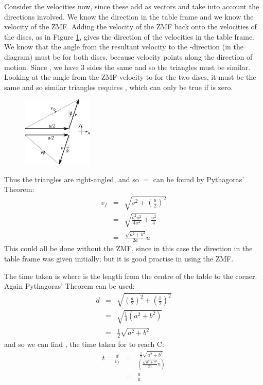 \begin{problem}
{\begin{enumerate}
Consider the velocities now, since these add as vectors and take into account the directions involved. We know the direction in the table frame and we know the velocity of the ZMF. Adding the velocity of the ZMF back onto the velocities of the discs, as in Figure \ref{fig:Dynamics_ZMF_velocity_add}, gives the direction of the velocities in the table frame. We know that the angle from the resultant velocity to the -direction (in the diagram) must be \vari{\theta} for both discs, because velocity points along the direction of motion. Since , we have 3 sides the same and so the triangles must be similar. Looking at the angle from the ZMF velocity to  for the two discs, it must be the same and so similar triangles requires , which can only be true if \vari{\phi} is zero.

\begin{figure}[h]
\centering
\includegraphics[width=0.3\textwidth]{../../../figures/Dynamics_ZMF_velocity_add.svg}
\caption{}\label{fig:Dynamics_ZMF_velocity_add}
\end{figure}

Thus the triangles are right-angled, and so  $=$  can be found by Pythagoras' Theorem:
\begin{eqnarray*} 
v_{f} &=& \sqrt{ v^{2} + \left(\frac{u}{2}\right)^{2}} \\ 
&=& \sqrt{ \frac{b^{2}u^{2}}{4a^{2}} + \frac{u^{2}}{4}} \\ 
&=& \frac{\sqrt{a^{2} + b^{2}}}{2a} u 
\end{eqnarray*}
This could all be done without the ZMF, since in this case the direction in the table frame was given initially; but it is good practise in using the ZMF.

The time taken is  where  is the length from the centre of the table to the corner. Again Pythagoras' Theorem can be used:
\begin{eqnarray*} 
d &=& \sqrt{ \left(\frac{a}{2}\right)^{2} + \left(\frac{b}{2}\right)^{2} } \\ 
&=& \sqrt{\frac{1}{4}(a^{2} + b^{2})} \\ 
&=& \frac{1}{2}\sqrt{a^{2} + b^{2}} 
\end{eqnarray*}
and so we can find , the time taken for  to reach C:
\begin{eqnarray*} 
t = \frac{d}{v_{f}} &=& \frac{\frac{1}{2}\sqrt{a^{2} + b^{2}}}{\left(\frac{\sqrt{a^{2} + b^{2}}}{2a} u\right)}\\
 &=& \frac{a}{u} 
\end{eqnarray*}


\end{enumerate}}
\end{problem}
